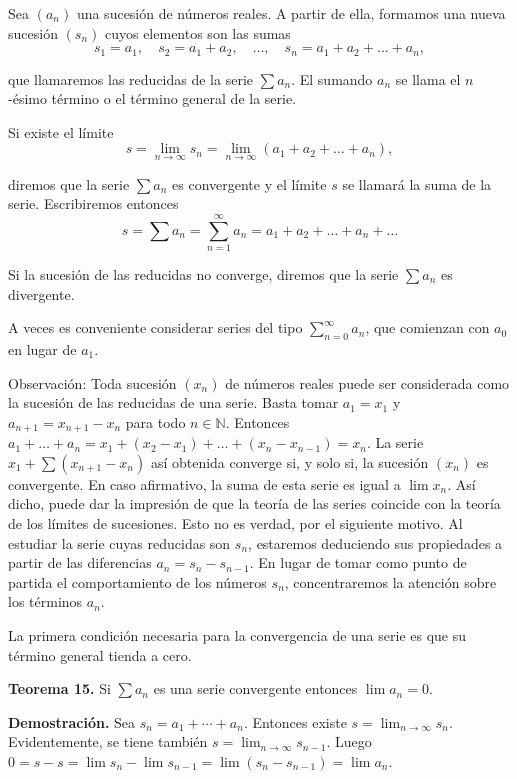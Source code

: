 \documentclass[12pt,oneside]{book}
\begin{document}
Sea \((a_n)\) una sucesión de números reales. A partir de ella, formamos una nueva sucesión \((s_n)\) cuyos elementos son las sumas
\[
s_1 = a_1, \quad s_2 = a_1 + a_2, \quad \dots, \quad s_n = a_1 + a_2 + \dots + a_n,
\]

que llamaremos las reducidas de la serie \(\sum a_n\). El sumando \(a_n\) se llama el \(n\)-ésimo término o el término general de la serie.

Si existe el límite
\[
s = \lim_{n \to \infty} s_n = \lim_{n \to \infty} (a_1 + a_2 + \dots + a_n),
\]

diremos que la serie \(\sum a_n\) es convergente y el límite \(s\) se llamará la suma de la serie. Escribiremos entonces
\[
s = \sum a_n = \sum_{n=1}^{\infty} a_n = a_1 + a_2 + \dots + a_n + \dots
\]

Si la sucesión de las reducidas no converge, diremos que la serie \(\sum a_n\) es divergente.

A veces es conveniente considerar series del tipo \(\sum_{n=0}^{\infty} a_n\), que comienzan con \(a_0\) en lugar de \(a_1\).

Observación: Toda sucesión \((x_n)\) de números reales puede ser considerada como la sucesión de las reducidas de una serie. Basta tomar \(a_1 = x_1\) y \(a_{n+1} = x_{n+1} - x_n\) para todo \(n \in \mathbb{N}\). Entonces \(a_1 + \dots + a_n = x_1 + (x_2 - x_1) + \dots + (x_n - x_{n-1}) = x_n\). La serie \(x_1 + \sum (x_{n+1} - x_n)\) así obtenida converge si, y solo si, la sucesión \((x_n)\) es convergente. En caso afirmativo, la suma de esta serie es igual a \(\lim x_n\). Así dicho, puede dar la impresión de que la teoría de las series coincide con la teoría de los límites de sucesiones. Esto no es verdad, por el siguiente motivo. Al estudiar la serie cuyas reducidas son \(s_n\), estaremos deduciendo sus propiedades a partir de las diferencias \(a_n = s_n - s_{n-1}\). En lugar de tomar como punto de partida el comportamiento de los números \(s_n\), concentraremos la atención sobre los términos \(a_n\).

La primera condición necesaria para la convergencia de una serie es que su término general tienda a cero.

\textbf{Teorema 15.} Si \(\sum a_n\) es una serie convergente entonces \(\lim a_n = 0\).

\textbf{Demostración.} Sea \(s_n = a_1 + \cdots + a_n\). Entonces existe \(s = \lim_{n \to \infty} s_n\). Evidentemente, se tiene también \(s = \lim_{n \to \infty} s_{n-1}\). Luego \(0 = s - s = \lim s_n - \lim s_{n-1} = \lim (s_n - s_{n-1}) = \lim a_n\).
\end{document}
